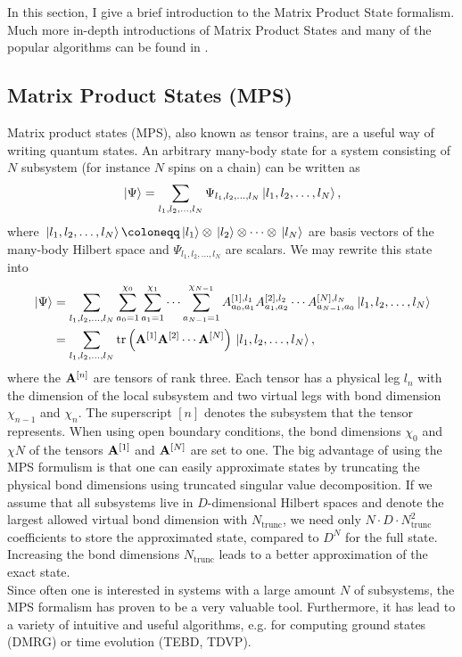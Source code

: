 In this section, I give a brief introduction to the Matrix Product State formalism. Much more in-depth introductions of Matrix
Product States and many of the popular algorithms can be found in \cite{Schollwöck:2011,Hauschild:2018}.
\subsection*{Matrix Product States (MPS)}
Matrix product states (MPS), also known as tensor trains, are a useful way of writing quantum states. 
An arbitrary many-body state for a system consisting of $N$ subsystem (for instance $N$ spins on a chain) can be written as
\begin{equation*}
    \ket*{\Psi} = \sum_{l_1, l_2, \dots, l_N} \Psi_{l_1, l_2, \dots, l_N} \ket*{l_1, l_2, \dots, l_N},
\end{equation*}
where $\ket*{l_1, l_2, \dots, l_N} \coloneqq \ket*{l_1} \otimes \ket*{l_2} \otimes \cdots \otimes \ket*{l_N}$ are basis vectors
of the many-body Hilbert space and $\Psi_{l_1, l_2, \dots, l_N}$ are scalars. We may rewrite this state into
\begin{equation*}
    \begin{split}
        \ket*{\Psi} &= \sum_{l_1, l_2, \dots, l_N} \sum_{a_0 = 1}^{\chi_0} \sum_{a_1 = 1}^{\chi_1} \cdots \sum_{a_{N-1} = 1}^{\chi_{N-1}} A_{a_0, a_1}^{[1], l_1} A_{a_1, a_2}^{[2], l_2}\cdots A_{a_{N-1}, a_0}^{[N], l_N} \ket*{l_1, l_2, \dots, l_N} \\
                    &= \sum_{l_1, l_2, \dots, l_N} \trace\left(
                        \vectorbold{A}^{[1]} \vectorbold{A}^{[2]} \cdots \vectorbold{A}^{[N]}
                        \right) \ket*{l_1, l_2, \dots, l_N},
    \end{split}
\end{equation*}
where the $\vectorbold{A}^{[n]}$ are tensors of rank three. Each tensor has a physical leg $l_n$ with the dimension of the local subsystem
and two virtual legs with bond dimension $\chi_{n-1}$ and $\chi_{n}$. The superscript $[n]$ denotes the subsystem that the tensor represents.
When using open boundary conditions, the bond dimensions $\chi_{0}$ and $\chi{N}$
of the tensors $\vectorbold{A}^{[1]}$ and $\vectorbold{A}^{[N]}$ are set to one. The big advantage of using the MPS formulism
is that one can easily approximate states by truncating the physical bond dimensions using truncated singular value decomposition.
If we assume that all subsystems live in $D$-dimensional Hilbert spaces and denote the largest allowed virtual bond dimension with $N_\text{trunc}$,
we need only $N\cdot D\cdot N_\text{trunc}^2$ coefficients to store the approximated state, compared to $D^N$ for the full state.
Increasing the bond dimensions $N_\text{trunc}$ leads to a better approximation of the exact state. \\
Since often one is interested in systems with a large amount $N$ of subsystems, the MPS formalism has proven to be a very 
valuable tool. Furthermore, it has lead to a variety of intuitive and useful algorithms, e.g. for computing ground states (DMRG)
or time evolution (TEBD, TDVP).
